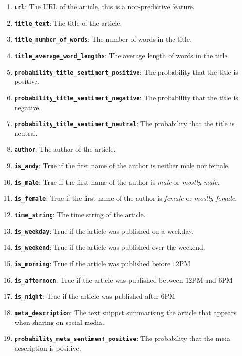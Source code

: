 \documentclass{article}
\begin{document}
\begin{enumerate}
\item \texttt{\textbf{url}}: The URL of the article, this is a non-predictive feature.
\item \texttt{\textbf{title\_text}}: The title of the article.
\item \texttt{\textbf{title\_number\_of\_words}}: The number of words in the title.
\item \texttt{\textbf{title\_average\_word\_lengths}}: The average length of words in the title.
\item \texttt{\textbf{probability\_title\_sentiment\_positive}}: The probability that the title is positive.
\item \texttt{\textbf{probability\_title\_sentiment\_negative}}: The probability that the title is negative.
\item \texttt{\textbf{probability\_title\_sentiment\_neutral}}: The probability that the title is neutral.
\item \texttt{\textbf{author}}: The author of the article.
\item \texttt{\textbf{is\_andy}}: True if the first name of the author is neither male nor female.
\item \texttt{\textbf{is\_male}}: True if the first name of the author is \emph{male} or \emph{mostly male}.
\item \texttt{\textbf{is\_female}}: True if the first name of the author is \emph{female} or \emph{mostly female}.
\item \texttt{\textbf{time\_string}}: The time string of the article.
\item \texttt{\textbf{is\_weekday}}: True if the article was published on a weekday.
\item \texttt{\textbf{is\_weekend}}: True if the article was published over the weekend.
\item \texttt{\textbf{is\_morning}}: True if the article was published before $12$PM
\item \texttt{\textbf{is\_afternoon}}: True if the article was published between $12$PM and $6$PM
\item \texttt{\textbf{is\_night}}: True if the article was published after $6$PM
\item \texttt{\textbf{meta\_description}}: The text snippet summarising the article that appears when sharing on social media.
\item \texttt{\textbf{probability\_meta\_sentiment\_positive}}: The probability that the meta description is positive.

\end{enumerate}
\end{document}
